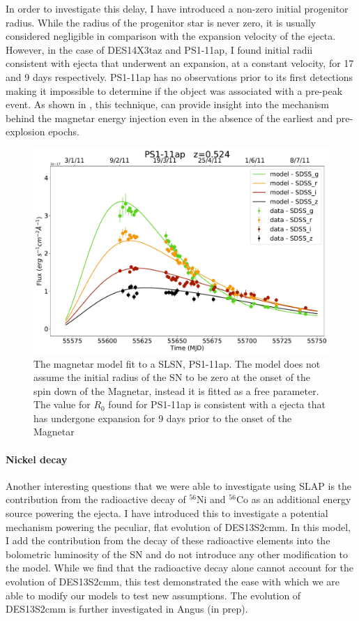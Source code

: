 In order to investigate this delay, I have introduced a non-zero initial progenitor radius. While the radius of the progenitor star is never zero, it is usually considered negligible in comparison with the expansion velocity of the ejecta. However, in the case of DES14X3taz and PS1-11ap, I found initial radii consistent with ejecta that underwent an expansion, at a constant velocity, for 17 and 9 days respectively. PS1-11ap has no observations prior to its first detections making it impossible to determine if the object was associated with a pre-peak event. As shown in , this technique, can provide insight into the mechanism behind the magnetar energy injection even in the absence of the earliest and pre-explosion epochs.

\begin{figure}
  \centering
  \includegraphics[width=\textwidth]{Figures/Chapter3/PS1-11ap}
  \caption{The magnetar model fit to a SLSN, PS1-11ap. The model does not assume the initial radius of the SN to be zero at the onset of the spin down of the Magnetar, instead it is fitted as a free parameter. The value for $R_0$ found for PS1-11ap is consistent with a ejecta that has undergone expansion for 9 days prior to the onset of the Magnetar}
  \label{fig:PS1-11apR0}
\end{figure}

\paragraph{Nickel decay}
Another interesting questions that we were able to investigate using \textsc{SLAP} is the contribution from the radioactive decay of $^{56}$Ni and $^{56}$Co as an additional energy source powering the ejecta. I have introduced this to investigate a potential mechanism powering the peculiar, flat evolution of DES13S2cmm. In this model, I add the contribution from the decay of these radioactive elements into the bolometric luminosity of the SN and do not introduce any other modification to the model. While we find that the radioactive decay alone cannot account for the evolution of DES13S2cmm, this test demonstrated the ease with which we are able to modify our models to test new assumptions. The evolution of DES13S2cmm is further investigated in Angus (in prep).

